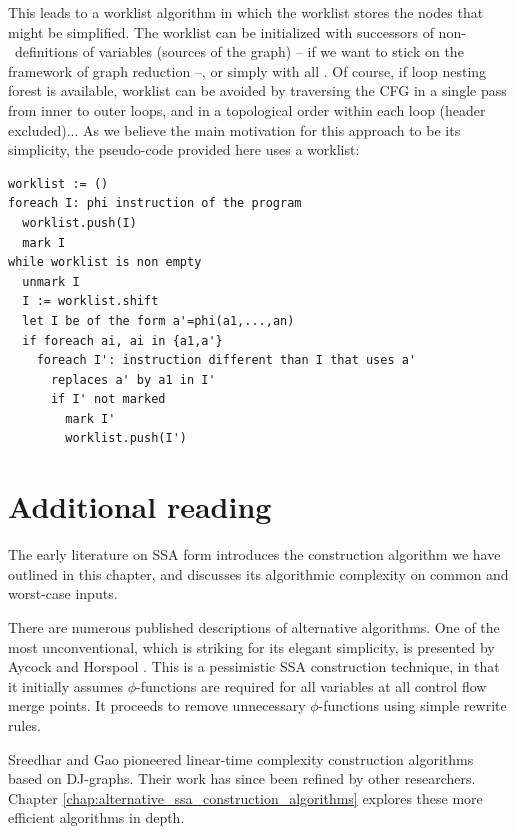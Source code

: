 This leads to a worklist algorithm in which the worklist stores the nodes that might be simplified. The worklist can be initialized with successors of non-\phiops\ definitions of variables (sources of the graph) -- if we want to stick on the framework of graph reduction --, or simply with all \phiops. Of course, if loop nesting forest is available, worklist can be avoided by traversing the CFG in a single pass from inner to outer loops, and in a topological order within each loop (header excluded)... 
As we believe the main motivation for this approach to be its simplicity, the pseudo-code provided here uses a worklist:

\begin{verbatim}
worklist := ()
foreach I: phi instruction of the program
  worklist.push(I)
  mark I
while worklist is non empty
  unmark I
  I := worklist.shift
  let I be of the form a'=phi(a1,...,an)
  if foreach ai, ai in {a1,a'}
    foreach I': instruction different than I that uses a'
      replaces a' by a1 in I'
      if I' not marked
        mark I'
        worklist.push(I')
\end{verbatim}


\section{Additional reading}

The early literature on SSA form
\cite{cytron89efficiently,cytron91efficiently}
introduces the construction algorithm we have outlined in this chapter,
and discusses its algorithmic complexity on common and worst-case inputs.

There are numerous published descriptions of alternative algorithms.
One of the most unconventional, which is striking for its elegant simplicity,
is presented by Aycock
and Horspool \cite{aycock00simple}. 
This is a pessimistic SSA construction technique,
in that it initially assumes $\phi$-functions are required
for all variables at all control flow merge points. 
It proceeds to remove unnecessary $\phi$-functions 
using simple rewrite rules.

Sreedhar and Gao \cite{sreedhar95linear} pioneered
linear-time complexity construction algorithms based on DJ-graphs.
Their work has since been refined by other researchers.
Chapter \ref{chap:alternative_ssa_construction_algorithms}
explores these more efficient algorithms in depth.


